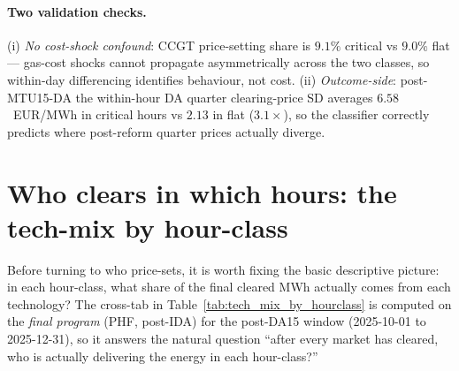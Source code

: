 \documentclass[11pt,a4paper]{article}
\begin{document}
\paragraph{Two validation checks.} (i) \emph{No cost-shock
confound}: CCGT price-setting share is $9.1\%$ critical vs $9.0\%$
flat --- gas-cost shocks cannot propagate asymmetrically across the
two classes, so within-day differencing identifies behaviour, not
cost. (ii) \emph{Outcome-side}: post-MTU15-DA the within-hour DA
quarter clearing-price SD averages $6.58$~EUR/MWh in critical hours
vs $2.13$ in flat ($3.1\times$), so the classifier correctly
predicts where post-reform quarter prices actually diverge.


\section{Who clears in which hours: the tech-mix by hour-class}\label{sec:prov:tech_mix}

\noindent Before turning to who price-sets, it is worth fixing the
basic descriptive picture: in each hour-class, what share of the
final cleared MWh actually comes from each technology? The cross-tab
in Table~\ref{tab:tech_mix_by_hourclass} is computed on the
\emph{final program} (PHF, post-IDA) for the post-DA15 window
(2025-10-01 to 2025-12-31), so it answers the natural question
``after every market has cleared, who is actually delivering the
energy in each hour-class?''
\end{document}
